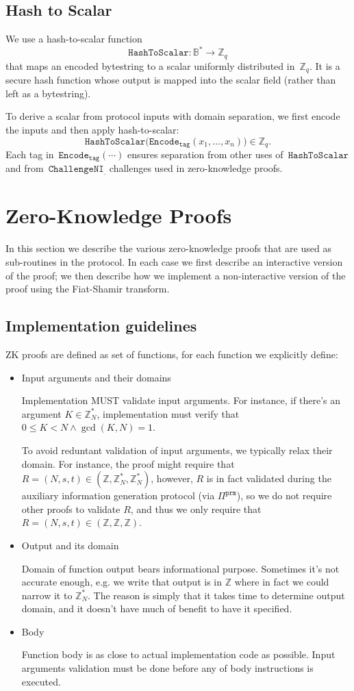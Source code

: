 \documentclass[11pt]{article}
\newcommand{\proof}[1]{\ensuremath{\Pi^{\mathtt{#1}}}}
\newcommand{\challengeni}[1]{\ensuremath{\mathtt{ChallengeNI}_{\mathtt{#1}}}}
\newcommand{\hashtoscalar}{\ensuremath{\mathtt{HashToScalar}}}
\newcommand{\Encode}[1][]{\ensuremath{\mathtt{Encode}_{\mathtt{#1}}}}
\newcommand{\Z}{\mathbb{Z}}
\newcommand{\?}[1]{\stackrel{?}{#1}}
\newcommand{\Byte}{\ensuremath{\mathbb{B}}}
\begin{document}
\subsection{Hash to Scalar}
\label{sec:hash-to-scalar}

We use a hash-to-scalar function
$$\hashtoscalar : \Byte^* \to \Z_q$$
that maps an encoded bytestring to a scalar uniformly distributed in~$\Z_q$.
It is a secure hash function whose output is mapped into the scalar field (rather than left as a bytestring).

To derive a scalar from protocol inputs with domain separation, we first encode the inputs and then apply hash-to-scalar:
$$\hashtoscalar\bigl(\Encode[tag](x_1, \dots, x_n)\bigr) \in \Z_q.$$
Each tag in~$\Encode[tag](\cdots)$ ensures separation from other uses of~$\hashtoscalar$ and from~$\challengeni{\cdot}$ challenges used in zero-knowledge proofs.


\section{Zero-Knowledge Proofs}
In this section we describe the various zero-knowledge proofs that are used as sub-routines in the protocol. In each case we first describe an interactive version of the proof; we then describe how we implement a non-interactive version of the proof using the Fiat-Shamir transform.

\subsection{Implementation guidelines}
ZK proofs are defined as set of functions, for each function we explicitly define:
\begin{itemize}
\item Input arguments and their domains

Implementation MUST validate input arguments. For instance, if there's an argument $K \in \Z_N^*$, implementation must verify that $0 \le K < N \land \gcd(K, N) = 1$.

To avoid reduntant validation of input arguments, we typically relax their domain. For instance, the proof might require that $R = (N, s, t) \in (\Z, \Z^*_N, \Z^*_N)$, however, $R$ is in fact validated during the auxiliary information generation protocol (via $\proof{prm}$), so we do not require other proofs to validate $R$, and thus we only require that $R = (N, s, t) \in (\Z, \Z, \Z)$.

\item Output and its domain

Domain of function output bears informational purpose. Sometimes it's not accurate enough, e.g. we write that output is in $\Z$ where in fact we could narrow it to $\Z^*_N$. The reason is simply that it takes time to determine output domain, and it doesn't have much of benefit to have it specified.

\item Body

Function body is as close to actual implementation code as possible. Input arguments validation must be done before any of body instructions is executed.
\end{itemize}
\end{document}
